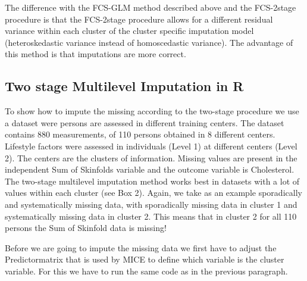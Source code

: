 \documentclass[]{book}
\newenvironment{Shaded}{\begin{snugshade}}{\end{snugshade}}
\newcommand{\KeywordTok}[1]{\textcolor[rgb]{0.13,0.29,0.53}{\textbf{#1}}}
\newcommand{\DataTypeTok}[1]{\textcolor[rgb]{0.13,0.29,0.53}{#1}}
\newcommand{\DecValTok}[1]{\textcolor[rgb]{0.00,0.00,0.81}{#1}}
\newcommand{\StringTok}[1]{\textcolor[rgb]{0.31,0.60,0.02}{#1}}
\newcommand{\CommentTok}[1]{\textcolor[rgb]{0.56,0.35,0.01}{\textit{#1}}}
\newcommand{\OperatorTok}[1]{\textcolor[rgb]{0.81,0.36,0.00}{\textbf{#1}}}
\newcommand{\NormalTok}[1]{#1}
\begin{document}
The difference with the FCS-GLM method described above and the
FCS-2stage procedure is that the FCS-2stage procedure allows for a
different residual variance within each cluster of the cluster specific
imputation model (heteroskedastic variance instead of homoscedastic
variance). The advantage of this method is that imputations are more
correct.

\subsection{Two stage Multilevel Imputation in
R}\label{two-stage-multilevel-imputation-in-r}

To show how to impute the missing according to the two-stage procedure
we use a dataset were persons are assessed in different training
centers. The dataset contains 880 measurements, of 110 persons obtained
in 8 different centers. Lifestyle factors were assessed in individuals
(Level 1) at different centers (Level 2). The centers are the clusters
of information. Missing values are present in the independent Sum of
Skinfolds variable and the outcome variable is Cholesterol. The
two-stage multilevel imputation method works best in datasets with a lot
of values within each cluster (see Box 2). Again, we take as an example
sporadically and systematically missing data, with sporadically missing
data in cluster 1 and systematically missing data in cluster 2. This
means that in cluster 2 for all 110 persons the Sum of Skinfold data is
missing!

Before we are going to impute the missing data we first have to adjust
the Predictormatrix that is used by MICE to define which variable is the
cluster variable. For this we have to run the same code as in the
previous paragraph.

\begin{Shaded}
\end{Shaded}
\end{document}
